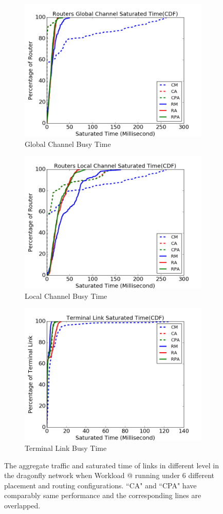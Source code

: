 \documentclass[conference,compsoc]{IEEEtran}
\makeatletter
\newcommand{\Rmnum}[1]{\expandafter\@slowromancap\romannumeral #1@}
\makeatother
\begin{document}
\begin{figure}[t!]
    \centering   
    \begin{subfigure}[t]{0.32\textwidth}
        \centering
        \includegraphics[height=1.8 in]{wkld/gc-stime}
        \caption{Global Channel Busy Time}
        \label{fig:global-channel-stime}
    \end{subfigure}\hfill
     \hspace{1em}%
    \begin{subfigure}[t]{0.32\textwidth}
        \centering
        \includegraphics[height=1.8 in]{wkld/lc-stime}
        \caption{Local Channel Busy Time}
        \label{fig:local-channel-stime}
    \end{subfigure}\hfill
    \hspace{1em}%
    \begin{subfigure}[t]{0.32\textwidth}
        \centering
        \includegraphics[height=1.8 in]{wkld/tl-stime}
        \caption{Terminal Link Busy Time}
        \label{fig:terminal-link-stime}
    \end{subfigure}%
   \caption{The aggregate traffic and saturated time of links in different level in the dragonfly network when Workload \Rmnum{1} running under 6 different placement and routing configurations. ``CA" and ``CPA" have comparably same performance and the corresponding lines are overlapped. }
   \label{fig:wkld-network-traffic-stime}
\end{figure}
\end{document}
